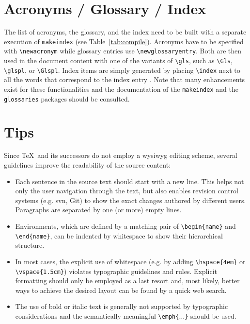 \section{Acronyms / Glossary / Index}

The list of acronyms, the glossary, and the index need to be built with a separate execution of \verb|makeindex| (see Table~\ref{tab:compile}).
Acronyms have to be specified with \verb|\newacronym| while glossary entries use \verb|\newglossaryentry|.
Both are then used in the document content with one of the variants of \verb|\gls|, such as \verb|\Gls|, \verb|\glspl|, or \verb|\Glspl|.
Index items are simply generated by placing \verb|\index| next to all the words that correspond to the index entry .
Note that many enhancements exist for these functionalities and the documentation of the \verb|makeindex| and the \verb|glossaries| packages should be consulted.

\section{Tips}

Since \TeX\ and its successors do not employ a \gls{wysiwyg} editing scheme, several guidelines improve the readability of the source content:
\begin{itemize}
\item Each sentence in the source text should start with a new line.
      This helps not only the user navigation through the text, but also enables revision control systems (e.g. \gls{svn}, Git) to show the exact changes authored by different users.
      Paragraphs are separated by one (or more) empty lines.
\item Environments, which are defined by a matching pair of \verb|\begin{name}| and \verb|\end{name}|, can be indented by whitespace to show their hierarchical structure.
\item In most cases, the explicit use of whitespace (e.g. by adding \verb|\hspace{4em}| or \verb|\vspace{1.5cm}|) violates typographic guidelines and rules.
      Explicit formatting should only be employed as a last resort and, most likely, better ways to achieve the desired layout can be found by a quick web search.
\item The use of bold or italic text is generally not supported by typographic considerations and the semantically meaningful \verb|\emph{|\texttt{$\dots$}\verb|}| should be used.
\end{itemize}

